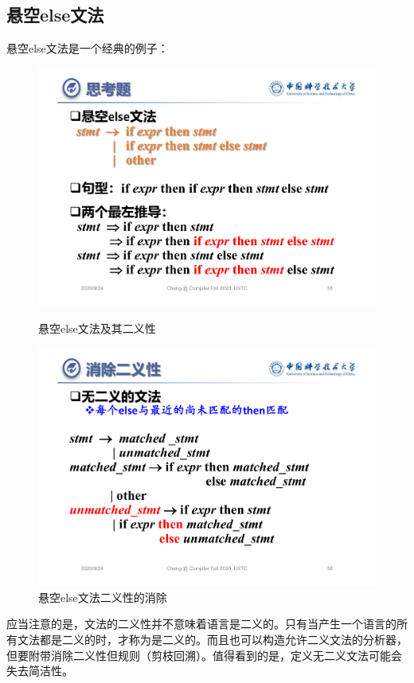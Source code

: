 \documentclass[]{report}
\begin{document}
		\subsection{悬空else文法}
		悬空else文法是一个经典的例子：
		\begin{figure}[h!]
			\centering
			\begin{minipage}{20em}
				\centering
				\includegraphics[scale = 0.2]{images/Impending_ELSE.pdf}
				\caption{悬空else文法及其二义性}
			\end{minipage}\quad
			\begin{minipage}{20em}
				\centering
				\includegraphics[scale = 0.2]{images/Eliminate_Ambiguity_of_ELSE.pdf}
				\caption{悬空else文法二义性的消除}
			\end{minipage}
		\end{figure}\par
		应当注意的是，文法的二义性并不意味着语言是二义的。只有当产生一个语言的所有文法都是二义的时，才称为是二义的。而且也可以构造允许二义文法的分析器，但要附带消除二义性但规则（剪枝回溯）。值得看到的是，定义无二义文法可能会失去简洁性。
\end{document}
